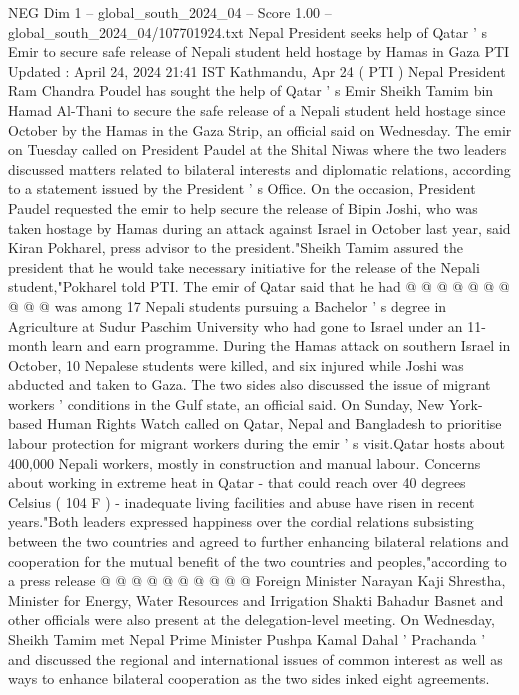 \begin{textsample}{NEG Dim 1 – global\_south\_2024\_04 – Score 1.00 – global\_south\_2024\_04/107701924.txt}  \label{ex:f1_neg_415}
Nepal President seeks help of Qatar ' s Emir to secure safe release of Nepali student held hostage by Hamas in Gaza PTI Updated : April 24, 2024 21:41 IST Kathmandu, Apr 24 ( PTI ) Nepal President Ram Chandra Poudel has sought the help of Qatar ' s Emir Sheikh Tamim bin Hamad Al-Thani to secure the safe release of a Nepali student held hostage since October by the Hamas in the Gaza Strip, an official said on Wednesday.
The emir on Tuesday called on President Paudel at the Shital Niwas where the two leaders discussed matters related to bilateral interests and diplomatic relations, according to a statement issued by the President ' s Office.
On the occasion, President Paudel requested the emir to help secure the release of Bipin Joshi, who was taken hostage by Hamas during an attack against Israel in October last year, said Kiran Pokharel, press advisor to the president."Sheikh Tamim assured the president that he would take necessary initiative for the release of the Nepali student,"Pokharel told PTI.
The emir of Qatar said that he had @ @ @ @ @ @ @ @ @ @ was among 17 Nepali students pursuing a Bachelor ' s degree in Agriculture at Sudur Paschim University who had gone to Israel under an 11-month learn and earn programme.
During the Hamas attack on southern Israel in October, 10 Nepalese students were killed, and six injured while Joshi was abducted and taken to Gaza.
The two sides also discussed the issue of migrant workers ' conditions in the Gulf state, an official said.
On Sunday, New York-based Human Rights Watch called on Qatar, Nepal and Bangladesh to prioritise labour protection for migrant workers during the emir ' s visit.Qatar hosts about 400,000 Nepali workers, mostly in construction and manual labour.
Concerns about working in extreme heat in Qatar - that could reach over 40 degrees Celsius ( 104 F ) - inadequate living facilities and abuse have risen in recent years."Both leaders expressed happiness over the cordial relations subsisting between the two countries and agreed to further enhancing bilateral relations and cooperation for the mutual benefit of the two countries and peoples,"according to a press release @ @ @ @ @ @ @ @ @ @ Foreign Minister Narayan Kaji Shrestha, Minister for Energy, Water Resources and Irrigation Shakti Bahadur Basnet and other officials were also present at the delegation-level meeting.
On Wednesday, Sheikh Tamim met Nepal Prime Minister Pushpa Kamal Dahal ' Prachanda ' and discussed the regional and international issues of common interest as well as ways to enhance bilateral cooperation as the two sides inked eight agreements.

\end{textsample}

